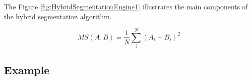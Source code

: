 The Figure \ref{fig:HybridSegmentationEngine1} illustrates the main
components of the hybrid segmentation algorithm.




%
%


\begin{equation}
MS(A,B) = \frac{1}{N} \sum_i^N \left( A_i - B_i \right)^2
\end{equation}





\subsection{Example}
\label{sec:HybridSegmentationExample1}




